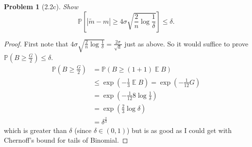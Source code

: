 \documentclass{article}
\newtheorem{problem}{Problem}
\newcommand{\expect}{\operatorname{\mathbb{E}}}
\begin{document}
\begin{problem}[2.2c]
Show
\[ \mathbb{P}\left[ |\tilde{m} - m|  \geq 4\sigma\sqrt{\frac{2}{n}\log\frac1\delta}\right] \leq \delta. \]
\end{problem}
\begin{proof}
First note that
 \( 4\sigma\sqrt{\frac{2}{n}\log\frac1\delta}
		 = \frac{2\sigma}{\sqrt{k}} \) just as above.
 So it would suffice to prove \( \mathbb{P}(B\geq\frac{G}{2}) \leq \delta \).
 \[\begin{split}
\mathbb{P}(B \geq \frac{G}{2})
&= \mathbb{P}\left(B \geq (1 + 1) \expect{B}\right) \\
&\leq \exp(-\frac13 \expect{B}) = \exp(-\frac{1}{12}G) \\
&= \exp(-\frac{1}{12} 8\log\frac1\delta) \\
&= \exp(\frac23\log\delta) \\
&= \delta^{\frac23}
\end{split}\]
which is greater than \( \delta \) (since \( \delta\in(0,1) \))
but is as good as I could get with Chernoff's bound for tails of Binomial.
\end{proof}
\end{document}
